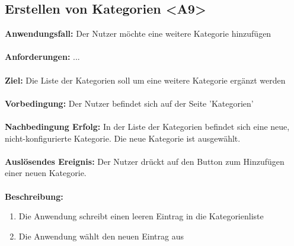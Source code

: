 \documentclass[parskip=full]{scrartcl} %
\begin{document}
\subsection*{Erstellen von Kategorien <A9>}
\textbf{Anwendungsfall:} Der Nutzer möchte eine weitere Kategorie hinzufügen\\\\
\textbf{Anforderungen:} ...\\\\
\textbf{Ziel:} Die Liste der Kategorien soll um eine weitere Kategorie ergänzt werden \\\\
\textbf{Vorbedingung:} Der Nutzer befindet sich auf der Seite 'Kategorien' \\\\
\textbf{Nachbedingung Erfolg:} In der Liste der Kategorien befindet sich eine neue, nicht-konfigurierte Kategorie. Die neue Kategorie ist ausgewählt.\\\\
\textbf{Auslösendes Ereignis:} Der Nutzer drückt auf den Button zum Hinzufügen einer neuen Kategorie. \\\\
\textbf{Beschreibung:}
\begin{enumerate}
    \item Die Anwendung schreibt einen leeren Eintrag in die Kategorienliste
    \item Die Anwendung wählt den neuen Eintrag aus
\end{enumerate}
\newpage
\end{document}
